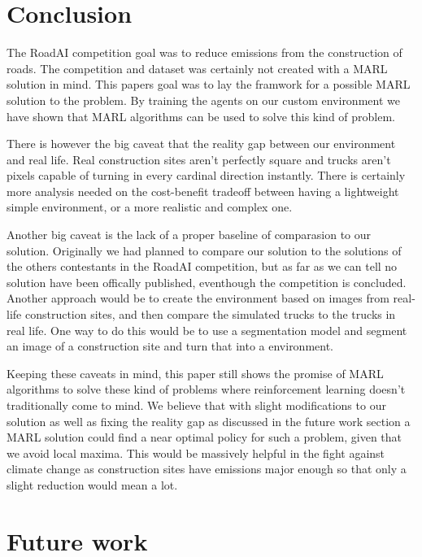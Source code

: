 \documentclass[conference]{IEEEtran}
\begin{document}
\section{Conclusion}

The RoadAI competition goal was to reduce \coo{} emissions from the construction of roads.
The competition and dataset was certainly not created with a MARL solution in mind.
This papers goal was to lay the framwork for a possible MARL solution to the problem.
By training the agents on our custom environment we have shown that MARL algorithms can be used to solve
this  kind of problem.

There is however the big caveat that the reality gap between our environment and real life.
Real construction sites aren't perfectly square and trucks aren't pixels capable of turning in every
cardinal direction instantly. There is certainly more analysis needed on the cost-benefit tradeoff
between having a lightweight simple environment, or a more realistic and complex one.

Another big caveat is the lack of a proper baseline of comparasion to our solution.
Originally we had planned to compare our solution to the solutions of the others contestants in the
RoadAI competition, but as far as we can tell no solution have been offically published, eventhough the competition
is concluded. Another approach would be to create the environment based on images from real-life
construction sites, and then compare the simulated trucks to the trucks in real life. One way to do this would be to use a segmentation model and segment an image of a construction site and turn that into a environment.

Keeping these caveats in mind, this paper still shows the promise of MARL algorithms to solve these kind of
problems where reinforcement learning doesn't traditionally come to mind. We believe that with slight modifications to our solution as well as fixing the reality gap as discussed in the future work section a MARL solution could find a near optimal policy for such a problem, given that we avoid local maxima. This would be massively helpful in the fight against climate change as construction sites have emissions major enough so that only a slight reduction would mean a lot.


\section{Future work}
\end{document}
